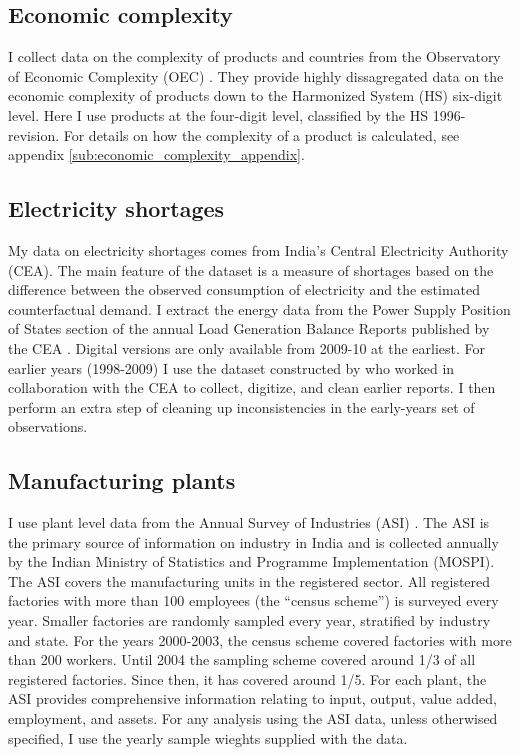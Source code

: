 \documentclass[11pt]{article}
\begin{document}
\subsection{Economic complexity}%
\label{sub:international_trade_data}
I collect data on the complexity of products and countries from the Observatory of Economic Complexity (OEC) \citep{simoes_economic_2011}. They provide highly dissagregated data on the economic complexity of products down to the Harmonized System (HS) six-digit level. Here I use products at the four-digit level, classified by the HS 1996-revision. For details on how the complexity of a product is calculated, see appendix \ref{sub:economic_complexity_appendix}.

\subsection{Electricity shortages}%
\label{sub:energy_data}
My data on electricity shortages comes from India's Central Electricity Authority (CEA). The main feature of the dataset is a measure of shortages based on the difference between the observed consumption of electricity and the estimated counterfactual demand. I extract the energy data from the Power Supply Position of States section of the annual Load Generation Balance Reports published by the CEA \citep{cea_load_2009}. Digital versions are only available from 2009-10 at the earliest. For earlier years (1998-2009) I use the dataset constructed by \cite{allcott_how_2016} who worked in collaboration with the CEA to collect, digitize, and clean earlier reports. I then perform an extra step of cleaning up inconsistencies in the early-years set of observations.

\subsection{Manufacturing plants}%
\label{sub:plant_data}
I use plant level data from the Annual Survey of Industries (ASI) \citep{mospi_annual_2000-1}. The ASI is the primary source of information on industry in India and is collected annually by the Indian Ministry of Statistics and Programme Implementation (MOSPI). The ASI covers the manufacturing units in the registered sector. All registered factories with more than 100 employees (the ``census scheme'') is surveyed every year. Smaller factories are randomly sampled every year, stratified by industry and state. For the years 2000-2003, the census scheme covered factories with more than 200 workers. Until 2004 the sampling scheme covered around 1/3 of all registered factories. Since then, it has covered around 1/5. For each plant, the ASI provides comprehensive information relating to input, output, value added, employment, and assets. For any analysis using the ASI data, unless otherwised specified, I use the yearly sample wieghts supplied with the data.
\end{document}
